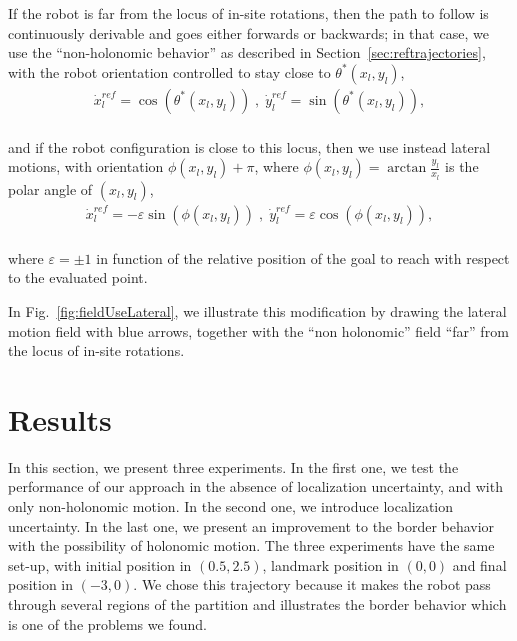 If the robot is far from the locus of in-site rotations, then the path to follow is continuously derivable and goes either forwards or backwards; in that case, we use the ``non-holonomic behavior'' as described in Section~\ref{sec:reftrajectories}, with the robot orientation controlled to stay close to $\theta^*(x_l,y_l)$,
$$
\begin{array}{c}
\dot{x}^{ref}_l  =  \cos(\theta^*(x_l,y_l)) \;,\; \dot{y}^{ref}_l  =  \sin(\theta^*(x_l,y_l)), \\
\end{array}
$$

\noindent and if the robot configuration is close to this locus, then we use instead lateral motions, with orientation $\phi(x_l,y_l)+\pi$, where $\phi(x_l,y_l)=\arctan\frac{y_l}{x_l}$ is the polar angle of $(x_l,y_l)$,
$$
\begin{array}{c}
\dot{x}^{ref}_l  =  -\varepsilon\sin(\phi(x_l,y_l)) \;,\; \dot{y}^{ref}_l  =  \varepsilon\cos(\phi(x_l,y_l)),  \\
\end{array}
$$

\noindent where $\varepsilon =\pm1$ in function of the relative position of the goal to reach with respect to the evaluated point. 

In Fig.~\ref{fig:fieldUseLateral}, we illustrate this modification by drawing the lateral motion field with blue arrows, together with the ``non holonomic'' field ``far'' from the locus of in-site rotations. 

\section{Results}


In this section, we present three experiments. In the first one, we test the performance of our approach in the absence of localization uncertainty, and with only non-holonomic motion. In the second one, we introduce localization uncertainty. In the last one, we present an improvement to the border behavior with the possibility of holonomic motion. The three experiments have the same set-up, with initial position in $(0.5,2.5)$, landmark position in $(0,0)$ and final position in $(-3,0)$. We chose this trajectory because it makes the robot pass through several regions of the partition and illustrates the border behavior which is one of the problems we found.

